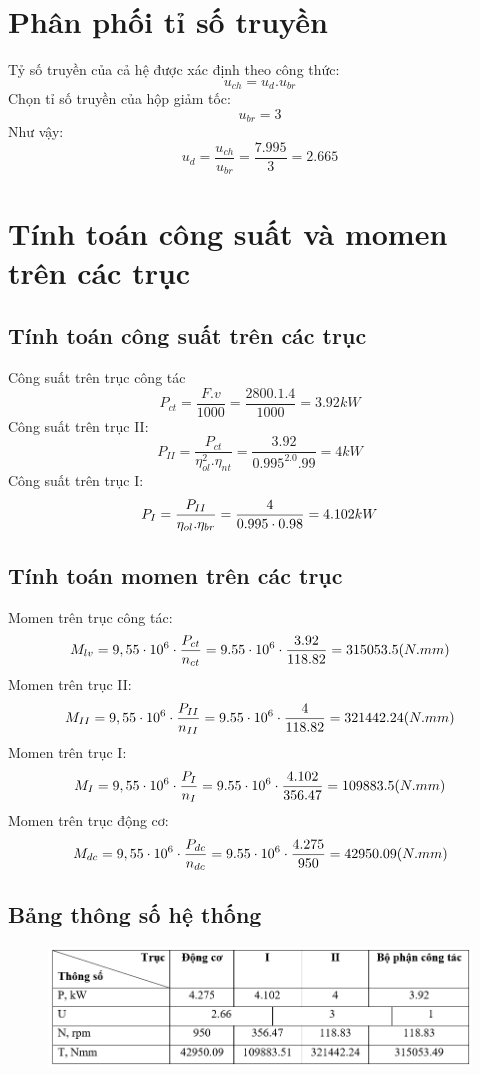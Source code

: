 \section{Phân phối tỉ số truyền}
Tỷ số truyền của cả hệ được xác định theo công thức:
\[
    u_{ch} = u_d.u_{br} 
\]
Chọn tỉ số truyền của hộp giảm tốc:
\[
    u_{br} = 3
\]
Như vậy: 
\[
    u_d = \frac{u_{ch}}{u_{br}} = \frac{7.995}{3} = 2.665
\]

\section{Tính toán công suất và momen trên các trục}
\subsection{Tính toán công suất trên các trục}
Công suất trên trục công tác
\[
    P_{ct} = \frac{F.v}{1000} = \frac{2800.1.4}{1000} = 3.92 kW
\]
Công suất trên trục II:
\[
    P_{II} = \frac{P_{ct}}{\eta_{ol}^2.\eta_{nt}} = \frac{3.92}{0.995^2.0.99} = 4 kW
\]
Công suất trên trục I:
\[
    P_{I} = \frac{P_{II}}{\eta_{ol}.\eta_{br}} = \frac{4}{0.995 \cdot 0.98} = 4.102 kW \\
\]
\subsection{Tính toán momen trên các trục}
Momen trên trục công tác:
\[
    M_{lv} = 9,55 \cdot 10^6 \cdot \frac{P_{ct}}{n_{ct}} = 9.55 \cdot 10^6 \cdot \frac{3.92}{118.82} = 315053.5 (N.mm) \\
\]
Momen trên trục II:
\[
    M_{II} = 9,55 \cdot 10^6 \cdot \frac{P_{II}}{n_{II}} = 9.55 \cdot 10^6 \cdot \frac{4}{118.82} = 321442.24 (N.mm) \\
\]
Momen trên trục I:
\[
    M_{I} = 9,55 \cdot 10^6 \cdot \frac{P_{I}}{n_{I}} = 9.55 \cdot 10^6 \cdot \frac{4.102}{356.47} = 109883.5 (N.mm) \\
\]
Momen trên trục động cơ:
\[
    M_{dc} = 9,55 \cdot 10^6 \cdot \frac{P_{dc}}{n_{dc}} = 9.55 \cdot 10^6 \cdot \frac{4.275}{950} = 42950.09 (N.mm) \\
\]

\subsection{Bảng thông số hệ thống}
\begin{figure}[H]
    \centering
    \includegraphics[width=1\textwidth]{pictures/bangdactinh.png}
\end{figure}